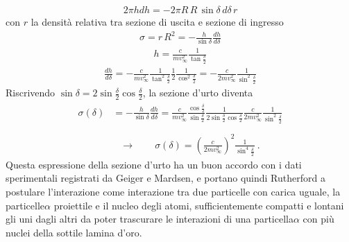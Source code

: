 \documentclass[letterpaper,10pt,italian]{jupyterBook}
\begin{document}
\sphinxAtStartPar
{}
\begin{equation*}
\begin{split}2 \pi h dh = - 2 \pi R \, R \, \sin \delta \, d \delta \, r \end{split}
\end{equation*}
\sphinxAtStartPar
con \(r\) la densità relativa tra sezione di uscita e sezione di ingresso
\begin{equation*}
\begin{split}\sigma = r \, R^2 = - \frac{h}{\sin \delta} \frac{dh}{d \delta}\end{split}
\end{equation*}\begin{equation*}
\begin{split}h = \frac{c}{m v_{\infty}^2} \frac{1}{\tan \frac{\delta}{2}}\end{split}
\end{equation*}\begin{equation*}
\begin{split}\frac{dh}{d \delta} = - \frac{c}{m v_{\infty}^2} \frac{1}{\tan^2 \frac{\delta}{2}} \frac{1}{2} \frac{1}{\cos^2 \frac{\delta}{2}} = - \frac{c}{2 m v_{\infty}^2} \frac{1}{\sin^2 \frac{\delta}{2}} \end{split}
\end{equation*}
\sphinxAtStartPar
Riscrivendo \(\sin \delta = 2 \sin \frac{\delta}{2} \cos \frac{\delta}{2}\), la sezione d’urto diventa
\begin{equation*}
\begin{split}\begin{aligned}
  \sigma(\delta) & = - \frac{h}{\sin \delta} \frac{dh}{d\delta} = \frac{c}{m v_{\infty}^2} \frac{\cos \frac{\delta}{2}}{\sin \frac{\delta}{2}} \frac{1}{2 \sin \frac{\delta}{2} \cos \frac{\delta}{2}} \frac{c}{2 m v_{\infty}^2} \frac{1}{\sin^2 \frac{\delta}{2}} \\
\end{aligned}\end{split}
\end{equation*}\begin{equation*}
\begin{split}
\qquad \rightarrow \qquad \sigma(\delta) = \left(\frac{c}{2 m v_{\infty}^2}\right)^2 \frac{1}{\sin^4 \frac{\delta}{2}} \ .
\end{split}
\end{equation*}
\sphinxAtStartPar
Questa espressione della sezione d’urto ha un buon accordo con i dati sperimentali registrati da Geiger e Mardsen, e portano quindi Rutherford a postulare l’interazione come interazione tra due particelle con carica uguale, la particelle\sphinxhyphen{}\(\alpha\) proiettile e il nucleo degli atomi, sufficientemente compatti e lontani gli uni dagli altri da poter trascurare le interazioni di una particella\sphinxhyphen{}\(\alpha\) con più nuclei della sottile lamina d’oro.
\end{document}
